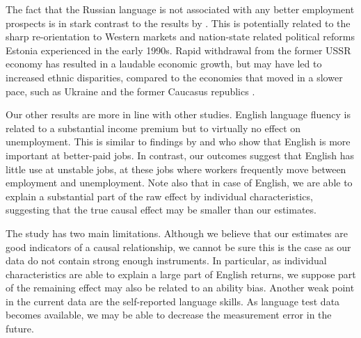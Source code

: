 \documentclass[12pt, a4paper]{article}
\begin{document}
The fact that the Russian language is not associated with any better
employment prospects
is in stark contrast to the results by \citet{Alan2015}. This is
potentially related to the sharp re-orientation to Western markets and
nation-state related political reforms Estonia experienced in the
early 1990s. Rapid withdrawal from the former USSR economy has
resulted in
a laudable economic growth, but may have led to
increased ethnic disparities, compared to the economies that moved in
a slower pace, such as Ukraine \citep{Constant2011} and the former Caucasus republics
\citep{Alan2015}. 

Our other results are more in line with other studies.
English language fluency is related to a substantial income premium but
to virtually no effect on unemployment. This is similar to findings by
\citet{ginsburgh+prieto-rodriguez2011ILRR} and \cite{fabo+2017E}
who show that English is more important at better-paid
jobs. In contrast, our outcomes suggest that English has little use
at unstable jobs, at these jobs where workers frequently move between
employment and unemployment.
Note also that in case of
English, we are able to explain a substantial part of the raw effect
by individual characteristics, suggesting that the true causal effect
may be smaller than our estimates.

The study has two main limitations. Although we believe that our
estimates are good indicators of a causal relationship, we cannot be
sure this is the case as our data do not contain strong enough instruments.
In particular, as individual characteristics are able to explain a
large part of English returns, we suppose part of the remaining effect
may also be related to an ability bias. Another weak point in the current
data are the self-reported language
skills. As language test data becomes available, we may be able to
decrease the measurement error in the future.




\clearpage
\appendix


\listoffixmes
\end{document}
